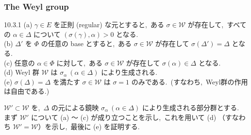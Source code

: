 \documentclass[uplatex,dvipdfmx]{jsarticle}
\begin{document}
\subsubsection{The Weyl group}
\begin{mythm}{10.3.1}
    (a) $\gamma \in E$ を正則 (regular) な元とすると,~ある $\sigma \in \mathcal{W}$ が存在して,~すべての $\alpha \in \Delta$ について $(\sigma(\gamma), \alpha) > 0$ となる.~\\
    (b) $\Delta'$ を $\Phi$ の任意の base とすると,~ある $\sigma \in \mathcal{W}$ が存在して $\sigma(\Delta') = \Delta$ となる.~\\
    (c) 任意の $\alpha \in \Phi$ に対して,~ある $\sigma \in \mathcal{W}$ が存在して $\sigma(\alpha) \in \Delta$ となる.~\\
    (d) Weyl 群 $\mathcal{W}$ は $\sigma_\alpha \ (\alpha \in \Delta)$ により生成される.~\\
    (e) $\sigma(\Delta) = \Delta$ を満たす $\sigma \in \mathcal{W}$ は $\sigma = 1$ のみである.~(すなわち,~Weyl群の作用は自由である.)
\end{mythm}
$\mathcal{W}' \subset \mathcal{W}$ を,~$\Delta$ の元による鏡映 $\sigma_\alpha \ (\alpha \in \Delta)$ により生成される部分群とする.~\\
まず $\mathcal{W}'$ について (a) 〜 (c) が成り立つことを示し,~これを用いて (d) （すなわち $\mathcal{W}' = \mathcal{W}$）を示し,~最後に (e) を証明する.~
\end{document}
